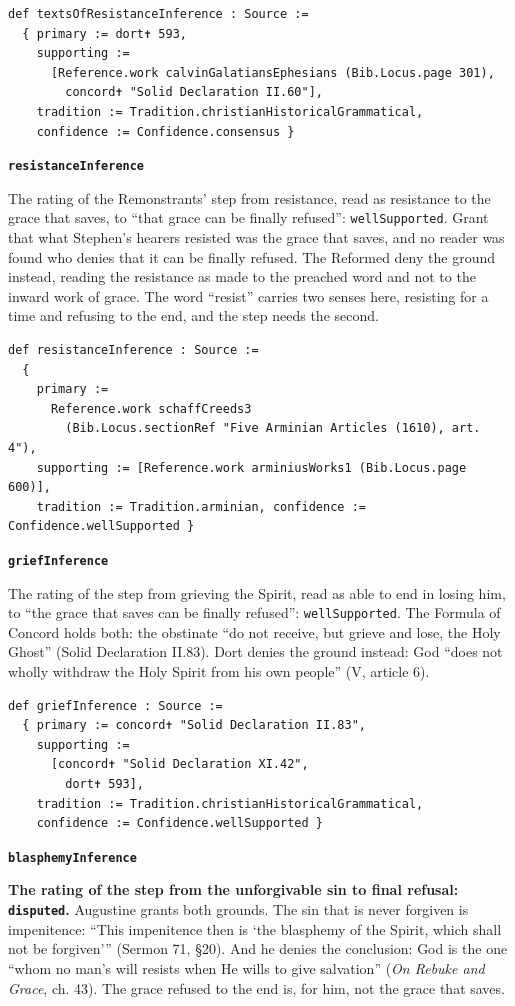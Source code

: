 \documentclass[11pt]{article}
\begin{document}
{\small\begin{verbatim}
def textsOfResistanceInference : Source :=
  { primary := dort✝ 593,
    supporting :=
      [Reference.work calvinGalatiansEphesians (Bib.Locus.page 301),
        concord✝ "Solid Declaration II.60"],
    tradition := Tradition.christianHistoricalGrammatical,
    confidence := Confidence.consensus }
\end{verbatim}}
\par\medskip\noindent\textbf{\texttt{resistance\allowbreak{}Inference}}\par\nobreak\noindent
The rating of the Remonstrants’ step from resistance, read as resistance to the grace that saves, to “that grace can be finally refused”: \texttt{well\allowbreak{}Supported}. Grant that what Stephen’s hearers resisted was the grace that saves, and no reader was found who denies that it can be finally refused. The Reformed deny the ground instead, reading the resistance as made to the preached word and not to the inward work of grace. The word “resist” carries two senses here, resisting for a time and refusing to the end, and the step needs the second.

{\small\begin{verbatim}
def resistanceInference : Source :=
  {
    primary :=
      Reference.work schaffCreeds3
        (Bib.Locus.sectionRef "Five Arminian Articles (1610), art. 4"),
    supporting := [Reference.work arminiusWorks1 (Bib.Locus.page 600)],
    tradition := Tradition.arminian, confidence := Confidence.wellSupported }
\end{verbatim}}
\par\medskip\noindent\textbf{\texttt{grief\allowbreak{}Inference}}\par\nobreak\noindent
The rating of the step from grieving the Spirit, read as able to end in losing him, to “the grace that saves can be finally refused”: \texttt{well\allowbreak{}Supported}. The Formula of Concord holds both: the obstinate “do not receive, but grieve and lose, the Holy Ghost” (Solid Declaration II.83). Dort denies the ground instead: God “does not wholly withdraw the Holy Spirit from his own people” (V, article 6).

{\small\begin{verbatim}
def griefInference : Source :=
  { primary := concord✝ "Solid Declaration II.83",
    supporting :=
      [concord✝ "Solid Declaration XI.42",
        dort✝ 593],
    tradition := Tradition.christianHistoricalGrammatical,
    confidence := Confidence.wellSupported }
\end{verbatim}}
\par\medskip\noindent\textbf{\texttt{blasphemy\allowbreak{}Inference}}\par\nobreak\noindent
\textbf{The rating of the step from the unforgivable sin to final refusal: \texttt{disputed}.} Augustine grants both grounds. The sin that is never forgiven is impenitence: “This impenitence then is ‘the blasphemy of the Spirit, which shall not be forgiven’” (Sermon 71, §20). And he denies the conclusion: God is the one “whom no man’s will resists when He wills to give salvation” (\emph{On Rebuke and Grace}, ch. 43). The grace refused to the end is, for him, not the grace that saves.
\end{document}
